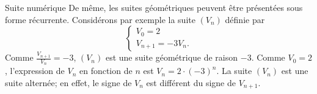 \begin{chapter}{Suite num\'erique}
De m\^eme, les suites g\'eom\'etriques peuvent \^etre pr\'esent\'ees sous forme r\'ecurrente.
Consid\'erons par exemple la suite $(V_n)$ d\'efinie par 
\[
\left\lbrace
\begin{array}{l}
V_0 = 2 \\
V_{n+1} = -3  V_n .
\end{array}
\right.
\]
Comme $\frac{V_{n+1}}{V_n} = -3$, $(V_n)$ est une suite g\'eom\'etrique de raison $-3$.
Comme $V_0 = 2$, l'expression de $V_n$ en fonction de $n$ est $V_n = 2 \cdot (-3)^n$.
La suite $(V_n)$ est une suite altern\'ee; en effet, le signe de $V_n$ est diff\'erent du signe de $V_{n+1}$.
%
%

\end{chapter}
